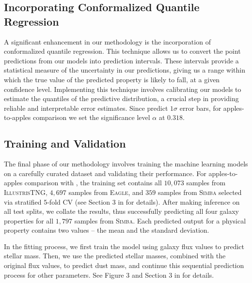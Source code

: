 \documentclass[letterpaper]{article}
\begin{document}
\subsection{Incorporating Conformalized Quantile Regression}
A significant enhancement in our methodology is the incorporation of conformalized quantile regression. This technique allows us to convert the point predictions from our models into prediction intervals. These intervals provide a statistical measure of the uncertainty in our predictions, giving us a range within which the true value of the predicted property is likely to fall, at a given confidence level. Implementing this technique involves calibrating our models to estimate the quantiles of the predictive distribution, a crucial step in providing reliable and interpretable error estimates. Since \cite{Gilda21} predict $1 \sigma$ error bars, for apples-to-apples comparison we set the significance level $\alpha$ at $0.318$.

\subsection{Training and Validation}
The final phase of our methodology involves training the machine learning models on a carefully curated dataset and validating their performance. For apples-to-apples comparison with \cite{Gilda21}, the training set contains all $10,073$ samples from \textsc{IllustrisTNG}, $4,697$ samples from \textsc{Eagle}, and $359$ samples from \textsc{Simba} selected via stratified 5-fold CV (see Section 3 in \citet{Gilda21} for details). After making inference on all test splits, we collate the results, thus successfully predicting all four galaxy properties for all $1,797$ samples from \textsc{Simba}. Each predicted output for a physical property contains two values -- the mean and the standard deviation.

In the fitting process, we first train the model using galaxy flux values to predict stellar mass. Then, we use the predicted stellar masses, combined with the original flux values, to predict dust mass, and continue this sequential prediction process for other parameters. See Figure 3 and Section 3 in \citet{Gilda21} for details.
\end{document}
